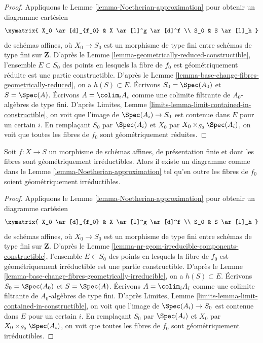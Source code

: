 \begin{proof}
Appliquons le
Lemme \ref{lemma-Noetherian-approximation}
pour obtenir un diagramme cartésien
$$
\xymatrix{
X_0 \ar[d]_{f_0} & X \ar[l]^g \ar[d]^f \\
S_0 & S \ar[l]_h
}
$$
de schémas affines, où $X_0 \to S_0$ est un morphisme de type fini entre
schémas de type fini sur $\mathbf{Z}$. D'après le
Lemme \ref{lemma-geometrically-reduced-constructible},
l'ensemble $E \subset S_0$ des points en lesquels la fibre de
$f_0$ est géométriquement réduite est une partie constructible. D'après le
Lemme \ref{lemma-base-change-fibres-geometrically-reduced},
on a $h(S) \subset E$. Écrivons $S_0 = \Spec(A_0)$ et
$S = \Spec(A)$. Écrivons $A = \colim_i A_i$ comme une
colimite filtrante de $A_0$-algèbres de type fini. D'après
Limites, Lemme \ref{limits-lemma-limit-contained-in-constructible},
on voit que l'image de $\Spec(A_i) \to S_0$ est contenue dans $E$
pour un certain $i$. En remplaçant $S_0$ par $\Spec(A_i)$ et
$X_0$ par $X_0 \times_{S_0} \Spec(A_i)$, on voit que
toutes les fibres de $f_0$ sont géométriquement réduites.
\end{proof}

\begin{lemma}
\label{lemma-Noetherian-approximation-geometrically-irreducible}
Soit $f : X \to S$ un morphisme de schémas affines, de
présentation finie et dont les fibres sont géométriquement irréductibles.
Alors il existe un diagramme comme dans le
Lemme \ref{lemma-Noetherian-approximation}
tel qu'en outre les fibres de $f_0$ soient géométriquement irréductibles.
\end{lemma}

\begin{proof}
Appliquons le
Lemme \ref{lemma-Noetherian-approximation}
pour obtenir un diagramme cartésien
$$
\xymatrix{
X_0 \ar[d]_{f_0} & X \ar[l]^g \ar[d]^f \\
S_0 & S \ar[l]_h
}
$$
de schémas affines, où $X_0 \to S_0$ est un morphisme de type fini entre
schémas de type fini sur $\mathbf{Z}$. D'après le
Lemme \ref{lemma-nr-geom-irreducible-components-constructible},
l'ensemble $E \subset S_0$ des points en lesquels la fibre de
$f_0$ est géométriquement irréductible est une partie constructible. D'après le
Lemme \ref{lemma-base-change-fibres-geometrically-irreducible},
on a $h(S) \subset E$. Écrivons $S_0 = \Spec(A_0)$ et
$S = \Spec(A)$. Écrivons $A = \colim_i A_i$ comme une
colimite filtrante de $A_0$-algèbres de type fini. D'après
Limites, Lemme \ref{limits-lemma-limit-contained-in-constructible},
on voit que l'image de $\Spec(A_i) \to S_0$ est contenue dans $E$
pour un certain $i$. En remplaçant $S_0$ par $\Spec(A_i)$ et
$X_0$ par $X_0 \times_{S_0} \Spec(A_i)$, on voit que
toutes les fibres de $f_0$ sont géométriquement irréductibles.
\end{proof}

